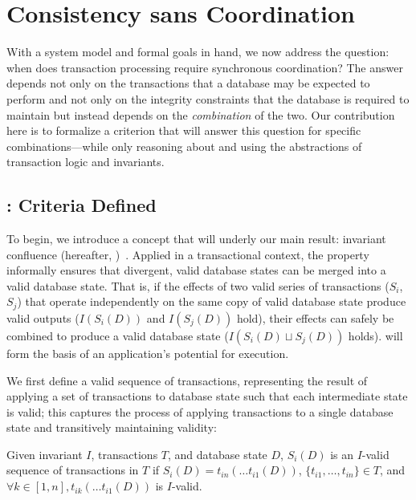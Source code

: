
\section{Consistency sans Coordination}
\label{sec:bcc-theory}

With a system model and formal goals in hand, we now address the
question: when does transaction processing require synchronous
coordination? The answer depends not only on the transactions that a
database may be expected to perform and not only on the integrity
constraints that the database is required to maintain but instead
depends on the \textit{combination} of the two. Our contribution here
is to formalize a criterion that will answer this question for
specific combinations---while only reasoning about and using the
abstractions of transaction logic and invariants.

\subsection{\iconfluence: Criteria Defined}

To begin, we introduce a concept that will underly our main result:
invariant confluence (hereafter,
\iconfluence)~\cite{obs-confluence}. Applied in a transactional
context, the \iconfluence property informally ensures that divergent,
valid database states can be merged into a valid database state. That
is, if the effects of two valid series of transactions ($S_i$, $S_j$)
that operate independently on the same copy of valid database state
produce valid outputs ($I(S_i(D))$ and $I(S_j(D))$ hold), their
effects can safely be combined to produce a valid database state
($I(S_i(D) \sqcup S_j(D))$ holds). \iconfluence will form the basis of
an application's potential for \cfree execution.

We first define a valid sequence of transactions, representing the
result of applying a set of transactions to database state such that
each intermediate state is valid; this captures the process of
applying transactions to a single database state and transitively
maintaining validity:

\begin{definition}
Given invariant $I$, transactions $T$, and database state $D$,
$S_i(D)$ is an $I$-valid sequence of transactions in $T$ if $S_i(D) =
t_{in}(\dots t_{i1}(D))$, $\{t_{i1}, \dots, t_{in}\} \in T$, and
$\forall k \in [1, n], t_{ik}(\dots t_{i1}(D))$ is $I$-valid.
\end{definition}

